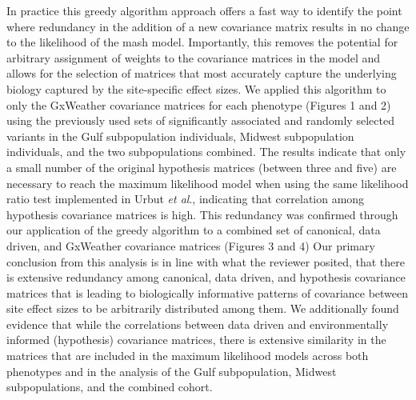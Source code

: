 \documentclass[
  letterpaper,
  DIV=11,
  numbers=noendperiod]{scrartcl}
\begin{document}
In practice this greedy algorithm approach offers a fast way to identify
the point where redundancy in the addition of a new covariance matrix
results in no change to the likelihood of the mash model. Importantly,
this removes the potential for arbitrary assignment of weights to the
covariance matrices in the model and allows for the selection of
matrices that most accurately capture the underlying biology captured by
the site-specific effect sizes. We applied this algorithm to only the
GxWeather covariance matrices for each phenotype (Figures 1 and 2) using
the previously used sets of significantly associated and randomly
selected variants in the Gulf subpopulation individuals, Midwest
subpopulation individuals, and the two subpopulations combined. The
results indicate that only a small number of the original hypothesis
matrices (between three and five) are necessary to reach the maximum
likelihood model when using the same likelihood ratio test implemented
in Urbut \emph{et al}., indicating that correlation among hypothesis
covariance matrices is high. This redundancy was confirmed through our
application of the greedy algorithm to a combined set of canonical, data
driven, and GxWeather covariance matrices (Figures 3 and 4) Our primary
conclusion from this analysis is in line with what the reviewer posited,
that there is extensive redundancy among canonical, data driven, and
hypothesis covariance matrices that is leading to biologically
informative patterns of covariance between site effect sizes to be
arbitrarily distributed among them. We additionally found evidence that
while the correlations between data driven and environmentally informed
(hypothesis) covariance matrices, there is extensive similarity in the
matrices that are included in the maximum likelihood models across both
phenotypes and in the analysis of the Gulf subpopulation, Midwest
subpopulations, and the combined cohort.
\end{document}
